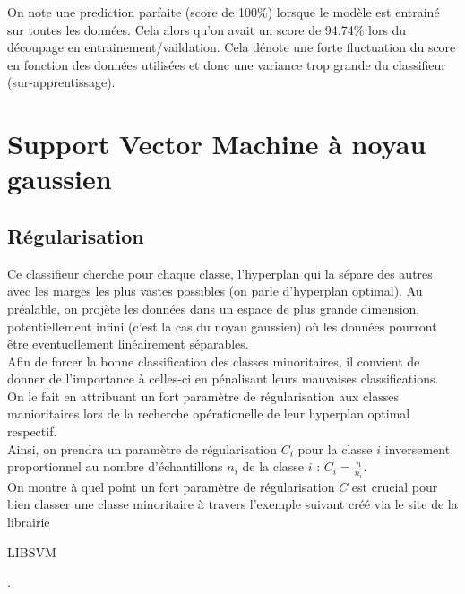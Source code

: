 \documentclass{book}
\begin{document}
On note une prediction parfaite (score de 100\%) lorsque le modèle est entrainé sur toutes les données. Cela alors qu'on avait un score de 94.74\% lors du découpage en entrainement/vaildation. Cela dénote une forte fluctuation 
du score en fonction des données utilisées et donc une variance trop grande du classifieur (sur-apprentissage).

\section{Support Vector Machine à noyau gaussien}

\subsection{Régularisation}

Ce classifieur cherche pour chaque classe, l'hyperplan qui la sépare des autres avec les marges les plus vastes possibles (on parle d'hyperplan optimal). Au préalable, on projète les données dans un espace de plus grande 
dimension, potentiellement infini (c'est la cas du noyau gaussien) où les données pourront être eventuellement linéairement séparables.\\
Afin de forcer la bonne classification des classes minoritaires, il convient de donner de l'importance à celles-ci en pénalisant leurs mauvaises classifications. On le fait en attribuant un fort paramètre de régularisation 
aux classes manioritaires lors de la recherche opérationelle de leur hyperplan optimal respectif.\\
Ainsi, on prendra un paramètre de régularisation $C_{i}$ pour la classe $i$ inversement proportionnel au nombre d'échantillons $n_{i}$ de la classe $i$ : $C_{i} = \frac{n}{n_i}$.\\
On montre à quel point un fort paramètre de régularisation $C$ est crucial pour bien classer
une classe minoritaire à travers l'exemple suivant créé via le site de la librairie \begin{itshape}LIBSVM\end{itshape}\cite{libsvm}.\\
\end{document}
